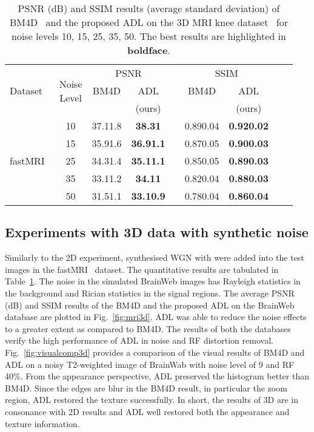 \documentclass[journal,twoside,web]{ieeecolor}
\begin{document}
\begin{table}\caption{PSNR (dB) and SSIM results (average  standard deviation) of BM4D~\cite{maggioni2012nonlocal} and the proposed ADL on the 3D MRI knee dataset~\cite{zbontar2018fastmri} for noise levels 10, 15, 25, 35, 50. The best results are highlighted in \textbf{boldface}.} 
    \label{table:resultslnee}
\centering 
\begin{tabular}{lcccccccc} \toprule
    \multirow{3}{*}{
    \parbox[c]{.04\linewidth}{\centering Dataset}}&
    \multirow{3}{*}{
    \parbox[c]{.09\linewidth}{\centering Noise\\Level}}
    & \multicolumn{2}{c}{PSNR} &
    &\multicolumn{2}{c}{SSIM} \\ 
    \cmidrule{3-4} \cmidrule{6-7}
 && \multicolumn{1}{c}{BM4D} & \multicolumn{1}{c}{ADL} & & \multicolumn{1}{c}{BM4D} &  \multicolumn{1}{c}{ADL}\\
  && \multicolumn{1}{c}{\cite{maggioni2012nonlocal}} &  \multicolumn{1}{c}{(ours)} & & \multicolumn{1}{c}{\cite{maggioni2012nonlocal}} & \multicolumn{1}{c}{(ours)}\\
\toprule
& 10 & 37.11.8 &\textbf{38.31}  && 0.890.04  & \textbf{0.920.02}\\
& 15 & 35.91.6 &\textbf{36.91.1}  && 0.870.05  & \textbf{0.900.03}\\
\verb//fastMRI~\cite{zbontar2018fastmri}& 25 & 34.31.4 & \textbf{35.11.1} && 0.850.05 & \textbf{0.890.03}\\
& 35 & 33.11.2 &\textbf{34.11} && 0.820.04 & \textbf{0.880.03}\\
& 50 & 31.51.1 &\textbf{33.10.9} && 0.780.04  & \textbf{0.860.04}\\
\bottomrule
\end{tabular}
\end{table}


\subsection{Experiments with 3D data with synthetic noise}
Similarly to the 2D experiment, synthesised WGN with  were added into the test images in the fastMRI~\cite{zbontar2018fastmri} dataset. The quantitative results are tabulated in Table~\ref{table:resultslnee}.
The noise in the simulated BrainWeb images has Rayleigh statistics in the background and Rician statistics in the signal regions. 
The average PSNR (dB) and SSIM results of the BM4D and the proposed ADL on the BrainWeb database are plotted in Fig.~\ref{fig:mri3d}. 
ADL was able to reduce the noise effects to a greater extent as compared to BM4D. 
The results of both the databases verify the high performance of ADL in noise and RF distortion removal. 
Fig.~\ref{fig:visualcomp3d} provides a comparison of the visual results of BM4D and ADL on a noisy T2-weighted image of BrainWab with noise level of 9 and RF 40\%. From the appearance perspective, ADL preserved the histogram better than BM4D. Since the edges are blur in the BM4D result, in particular the zoom region, ADL restored the texture successfully. In short, the results of 3D are in consonance with 2D results and ADL well restored both the appearance and texture information. 
\end{document}

